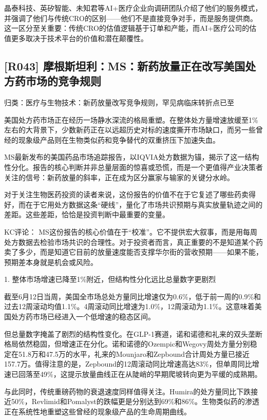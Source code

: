 \documentclass[11pt]{ctexart}
\begin{document}
晶泰科技、英矽智能、未知君等AI+医疗企业向调研团队介绍了他们的服务模式，并强调了他们与传统CRO的区别——他们不是直接竞争对手，而是服务提供商。这一区分至关重要：传统CRO的估值逻辑基于订单和产能，而AI+医疗公司的估值更多取决于技术平台的价值和潜在颠覆性。

\subsection{[R043] 摩根斯坦利：MS：新药放量正在改写美国处方药市场的竞争规则}
{\small\color{refgray}归类：医疗与生物技术：新药放量改写竞争规则，罕见病临床转折点已至}

美国处方药市场正在经历一场静水深流的格局重塑。在整体处方量增速放缓至1\%左右的大背景下，少数新药正在以远超历史对标的速度撕开市场缺口，而另一些曾经的现象级产品则在生物类似药和竞争替代的双重挤压下加速失血。

MS最新发布的美国药品市场追踪报告，以IQVIA处方数据为锚，揭示了这一结构性分化。报告的核心判断并非总量层面的惊喜或恐慌，而是一个更值得产业决策者关注的信号：新药放量的斜率，正在成为区分赢家与输家的关键分水岭。

对于关注生物医药投资的读者来说，这份报告的价值不在于它复述了哪些药卖得好，而在于它用处方数据这条“硬线”，量化了市场共识预期与真实放量轨迹之间的差距。这些差距，恰恰是投资判断中最重要的变量。

KC评论： MS这份报告的核心价值在于“校准”。它不提供宏大叙事，而是用每周处方数据去检验市场共识的合理性。对于投资者而言，真正重要的不是知道某个药卖了多少，而是知道它目前的放量速度能否支撑华尔街的营收预期——如果不能，预期差本身就是机会或风险。

1. 整体市场增速已降至1\%附近，但结构性分化远比总量数字更剧烈

截至6月12日当周，美国全市场总处方量同比增速仅为0.6\%，低于前一周的0.9\%和过去12周滚动均值1.1\%。4周滚动同比增速为1.0\%，12周滚动为1.1\%。这意味着美国处方药市场已经进入一个低增速的稳态区间。

但总量数字掩盖了剧烈的结构性变化。在GLP-1赛道，诺和诺德和礼来的双头垄断格局依然稳固，但增速正在分化。诺和诺德的Ozempic和Wegovy周处方量分别稳定在51.8万和47.5万的水平，礼来的Mounjaro和Zepbound合计周处方量已接近157.7万。值得注意的是，Zepbound的12周滚动同比增速高达83\%，但单周同比增速已回落至49\%，这提示放量曲线正在从陡峭的早期爬坡转向更为平缓的成熟期。

与此同时，传统重磅药物的衰退速度同样值得关注。Humira的处方量同比下跌接近50\%，Revlimid和Pomalyst的跌幅更是分别达到69\%和86\%。生物类似药的渗透正在系统性地重塑这些曾经的现象级产品的生命周期曲线。
\end{document}
